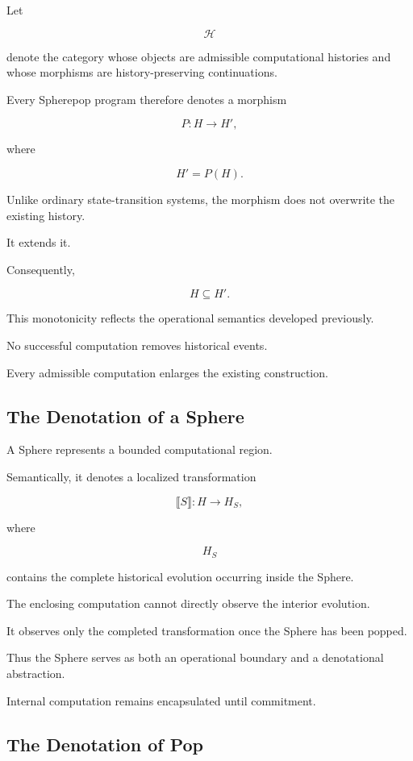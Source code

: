 \documentclass[12pt,oneside]{article}
\theoremstyle{definition}
\theoremstyle{remark}
\begin{document}
Let

\[
\mathcal{H}
\]

denote the category whose objects are admissible computational histories and
whose morphisms are history-preserving continuations.

Every Spherepop program therefore denotes a morphism

\[
P :
H
\longrightarrow
H',
\]

where

\[
H'
=
P(H).
\]

Unlike ordinary state-transition systems, the morphism does not overwrite the
existing history.

It extends it.

Consequently,

\[
H
\subseteq
H'.
\]

This monotonicity reflects the operational semantics developed previously.

No successful computation removes historical events.

Every admissible computation enlarges the existing construction.

\subsection{The Denotation of a Sphere}

A Sphere represents a bounded computational region.

Semantically, it denotes a localized transformation

\[
\llbracket
S
\rrbracket :
H
\longrightarrow
H_S,
\]

where

\[
H_S
\]

contains the complete historical evolution occurring inside the Sphere.

The enclosing computation cannot directly observe the interior evolution.

It observes only the completed transformation once the Sphere has been popped.

Thus the Sphere serves as both an operational boundary and a denotational
abstraction.

Internal computation remains encapsulated until commitment.

\subsection{The Denotation of Pop}
\end{document}

